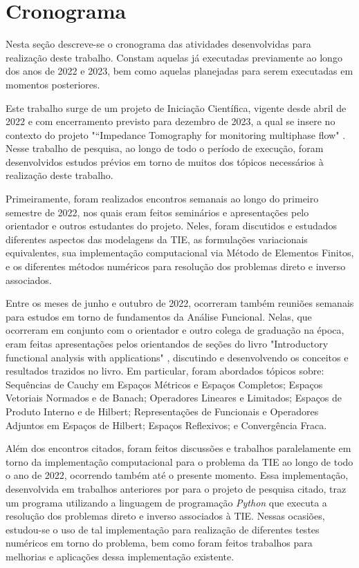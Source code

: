 \chapter{Cronograma}

Nesta seção descreve-se o cronograma das atividades desenvolvidas para realização deste trabalho. Constam aquelas já executadas previamente ao longo dos anos de 2022 e 2023, bem como aquelas planejadas para serem executadas em momentos posteriores.

Este trabalho surge de um projeto de Iniciação Científica, vigente desde abril de 2022 e com encerramento previsto para dezembro de 2023, a qual se insere no contexto do projeto "“Impedance Tomography for monitoring multiphase flow" \cite{margotti-eit}. Nesse trabalho de pesquisa, ao longo de todo o período de execução, foram desenvolvidos estudos prévios em torno de muitos dos tópicos necessários à realização deste trabalho. 

Primeiramente, foram realizados encontros semanais ao longo do primeiro semestre de 2022, nos quais eram feitos seminários e apresentações pelo orientador e outros estudantes do projeto. Neles, foram discutidos e estudados diferentes aspectos das modelagens da TIE, as formulações variacionais equivalentes, sua implementação computacional via Método de Elementos Finitos, e os diferentes métodos numéricos para resolução dos problemas direto e inverso associados.  

Entre os meses de junho e outubro de 2022, ocorreram também reuniões semanais para estudos em torno de fundamentos da Análise Funcional. Nelas, que ocorreram em conjunto com o orientador e outro colega de graduação na época, eram feitas apresentações pelos orientandos de seções do livro "Introductory functional analysis with applications" \cite{kreyszig}, discutindo e desenvolvendo os conceitos e resultados trazidos no livro. Em particular, foram abordados tópicos sobre: Sequências de Cauchy em Espaços Métricos e Espaços Completos; Espaços Vetoriais Normados e de Banach; Operadores Lineares e Limitados; Espaços de Produto Interno e de Hilbert; Representações de Funcionais e Operadores Adjuntos em Espaços de Hilbert; Espaços Reflexivos; e Convergência Fraca.

Além dos encontros citados, foram feitos discussões e trabalhos paralelamente em torno da implementação computacional para o problema da TIE ao longo de todo o ano de 2022, ocorrendo também até o presente momento. Essa implementação, desenvolvida em trabalhos anteriores por  para o projeto de pesquisa citado, traz um programa utilizando a linguagem de programação \textit{Python} que executa a resolução dos problemas direto e inverso associados à TIE. Nessas ocasiões, estudou-se o uso de tal implementação para realização de diferentes testes numéricos em torno do problema, bem como foram feitos trabalhos para melhorias e aplicações dessa implementação existente. 

